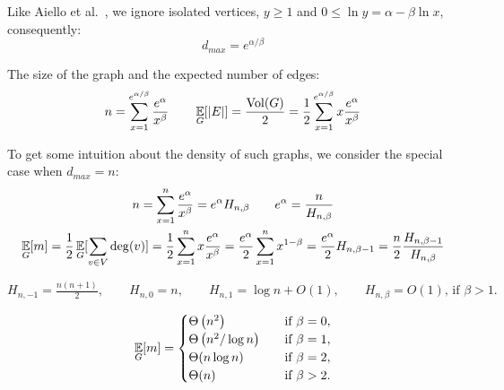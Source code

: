 Like Aiello et al.~\cite{acl01}, we ignore isolated vertices, $y\geq1$
and $0\leq\ln y=\alpha-\beta\ln x$, consequently:
\begin{equation}
    d_{max}=e^{\alpha/\beta}
\end{equation}

The size of the graph and the expected number of edges:
\begin{equation}
    \label{eq:powerlaw-coin-toss-n-e}
    n=\sum_{x=1}^{e^{\alpha/\beta}}{\frac{e^\alpha}{x^\beta}}
    \qquad \mathop{{}\mathbb{E}}_G[|E|]=\frac{\operatorname*{Vol}(G)}{2}=\frac{1}{2}\sum_{x=1}^{e^{\alpha/\beta}}{x\frac{e^\alpha}{x^\beta}}
\end{equation}

%
%
%
%

To get some intuition about the density of such graphs,
we consider the special case when $d_{max}=n$:
\begin{gather}
    n=\sum_{x=1}^{n}\frac{e^\alpha}{x^\beta}=e^\alpha H_{n,\beta} \qquad e^\alpha=\frac{n}{H_{n,\beta}}\\
    \mathop{{}\mathbb{E}}_G[m]=\frac{1}{2}\mathop{{}\mathbb{E}}_G[\sum_{v \in V}\deg(v)]=\frac{1}{2}\sum_{x=1}^{n}x\frac{e^\alpha}{x^\beta}
    =\frac{e^\alpha}{2}\sum_{x=1}^{n}x^{1-\beta}=\frac{e^\alpha}{2}H_{n,\beta-1}
    =\frac{n}{2}\frac{H_{n,\beta-1}}{H_{n,\beta}}
\end{gather}

$H_{n,-1}=\frac{n(n+1)}{2},
\qquad H_{n,0}=n,
\qquad H_{n,1}=\log n+O(1),
\qquad H_{n,\beta}=O(1)\text{, if }\beta>1.$

\begin{equation}
    \mathop{{}\mathbb{E}}_G[m]=
    \begin{cases}
        \Theta\left(n^2\right) & \quad \text{if } \beta=0,\\
        \Theta\left(n^2/\log n\right) & \quad \text{if } \beta=1,\\
        \Theta(n\log n) & \quad \text{if } \beta=2,\\
        \Theta(n) & \quad \text{if } \beta>2.
    \end{cases}
\end{equation}

